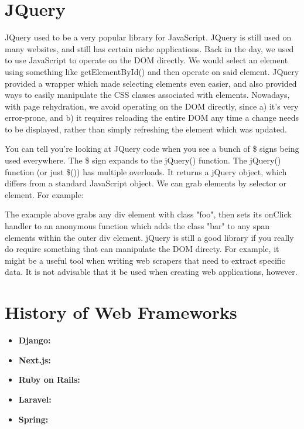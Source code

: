 \documentclass{article}
\begin{document}
\section{JQuery}

JQuery used to be a very popular library for JavaScript. JQuery is still used on many websites, and still has
certain niche applications. Back in the day, we used to use JavaScript to operate on the DOM directly. We would
select an element using something like getElementById() and then operate on said element. JQuery provided a
wrapper which made selecting elements even easier, and also provided ways to easily manipulate the CSS classes
associated with elements. Nowadays, with page rehydration, we avoid operating on the DOM directly, since a) it's
very error-prone, and b) it requires reloading the entire DOM any time a change needs to be displayed, rather
than simply refreshing the element which was updated.

You can tell you're looking at JQuery code when you see a bunch of \$ signs being used everywhere. The \$ sign
expands to the jQuery() function. The jQuery() function (or just \$()) has multiple overloads. It returns a
jQuery object, which differs from a standard JavaScript object. We can grab elements by selector or element.
For example:


The example above grabs any div element with class "foo", then sets its onClick handler to an anonymous
function which adds the class "bar" to any span elements within the outer div element. jQuery is still a good
library if you really do require something that can manipulate the DOM directy. For example, it might be a
useful tool when writing web scrapers that need to extract specific data. It is not advisable that it be used
when creating web applications, however.

\section{History of Web Frameworks}

\begin{itemize}

\item{%
    \textbf{Django:}
}

\item{%
    \textbf{Next.js:}
}

\item{%
    \textbf{Ruby on Rails:}
}

\item{%
    \textbf{Laravel:}
}

\item{%
    \textbf{Spring:}
}

\end{itemize}
\end{document}
